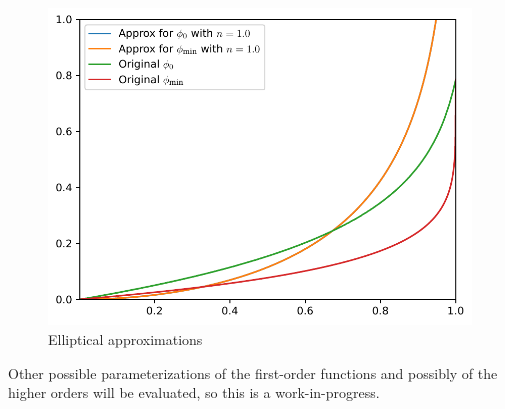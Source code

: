 \begin{figure}[H]
    \centering
    \includegraphics[scale=0.75]{plots/elliptical-approx.pdf}
    \caption{Elliptical approximations}
\end{figure}

Other possible parameterizations of the first-order functions and possibly of the higher orders will be evaluated, so this is a work-in-progress.